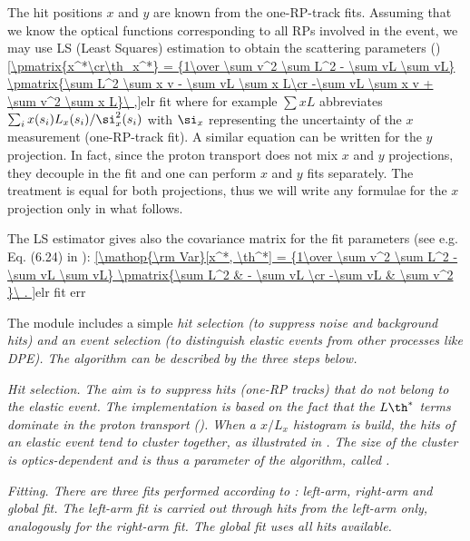 The hit positions $x$ and $y$ are known from the one-RP-track fits. Assuming that we know the optical functions corresponding to all RPs involved in the event, we may use LS (Least Squares) estimation to obtain the scattering parameters ()
\eqref{\pmatrix{x^*\cr\th_x^*} = {1\over \sum v^2 \sum L^2 - \sum vL \sum vL} \pmatrix{\sum L^2 \sum x v - \sum vL \sum x L\cr -\sum vL \sum x v + \sum v^2 \sum x L}\ ,}{elr fit}
where for example $\sum x L$ abbreviates $\sum_{i} x(s_i) L_x(s_i) / \si_x^2(s_i)$ with $\si_x$ representing the uncertainty of the $x$ measurement (one-RP-track fit). A similar equation can be written for the $y$ projection. In fact, since the proton transport does not mix $x$ and $y$ projections, they decouple in the fit and one can perform $x$ and $y$ fits separately. The treatment is equal for both projections, thus we will write any formulae for the $x$ projection only in what follows.

The LS estimator gives also the covariance matrix for the fit parameters (see e.g. Eq. (6.24) in ):
\eqref{\mathop{\rm Var}[x^*, \th^*] = {1\over \sum v^2 \sum L^2 - \sum vL \sum vL} \pmatrix{\sum L^2 & - \sum vL \cr -\sum vL & \sum v^2 }\ .
}{elr fit err}

The module includes a simple \em{hit selection} (to suppress noise and background hits) and an \em{event selection} (to distinguish elastic events from other processes like DPE). The algorithm can be described by the three steps below.

\bitm
\itm \em{Hit selection}. The aim is to suppress hits (one-RP tracks) that do not belong to the elastic event. The implementation is based on the fact that the $L\th^*$ terms dominate in the proton transport  (). When a $x/L_x$ histogram is build, the hits of an elastic event tend to cluster together, as illustrated in . The size of the cluster is optics-dependent and is thus a parameter of the algorithm, called .


\itm \em{Fitting}. There are three fits performed according to : left-arm, right-arm and global fit. The left-arm fit is carried out through hits from the left-arm only, analogously for the right-arm fit. The global fit uses all hits available.


